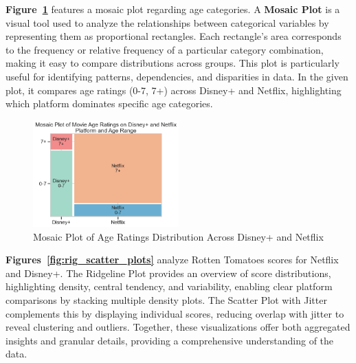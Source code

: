 \documentclass[a4paper, 12pt]{article}
\begin{document}
\vspace{0.5cm}

\textbf{Figure~\ref{fig:mosaic_age}} features a mosaic plot regarding age categories. A \textbf{Mosaic Plot} is a visual tool used to analyze the relationships between categorical variables by representing them as proportional rectangles. Each rectangle's area corresponds to the frequency or relative frequency of a particular category combination, making it easy to compare distributions across groups. This plot is particularly useful for identifying patterns, dependencies, and disparities in data. In the given plot, it compares age ratings (0-7, 7+) across Disney+ and Netflix, highlighting which platform dominates specific age categories.

\begin{figure}[H]
    \centering
    \includegraphics[width=0.5\textwidth]{mosaic.png} %
    \caption{Mosaic Plot of Age Ratings Distribution Across Disney+ and Netflix}
    \label{fig:mosaic_age}
\end{figure}

\textbf{Figures~\ref{fig:rig_scatter_plots}} analyze Rotten Tomatoes scores for Netflix and Disney+. The Ridgeline Plot provides an overview of score distributions, highlighting density, central tendency, and variability, enabling clear platform comparisons by stacking multiple density plots. The Scatter Plot with Jitter complements this by displaying individual scores, reducing overlap with jitter to reveal clustering and outliers. Together, these visualizations offer both aggregated insights and granular details, providing a comprehensive understanding of the data. \cite{Waskom2021}
\end{document}
